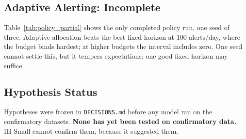 \documentclass[11pt,a4paper]{article}
\begin{document}
\begin{table}[htbp]
\centering
\small
\caption{Detection and stoppable value by typology at 500 alerts/day, HI-Small. Each typology has few attempts, so differences between typologies are indicative only.}
\label{tab:typology}
\resizebox{0.82\textwidth}{!}{}
\end{table}

\subsection{Adaptive Alerting: Incomplete}
Table~\ref{tab:policy_partial} shows the only completed policy run, one seed of three. Adaptive allocation beats the best fixed horizon at 100 alerts/day, where the budget binds hardest; at higher budgets the interval includes zero. One seed cannot settle this, but it tempers expectations: one good fixed horizon may suffice.

\begin{table}[htbp]
\centering
\small
\caption{Adaptive alert policy against the best fixed horizon selected on validation, HI-Small, Released protocol. \emph{One seed only; the run was stopped.}}
\label{tab:policy_partial}

\end{table}

\subsection{Hypothesis Status}
Hypotheses were frozen in \texttt{DECISIONS.md} before any model ran on the confirmatory datasets. \textbf{None has yet been tested on confirmatory data.} HI-Small cannot confirm them, because it suggested them.
\end{document}

